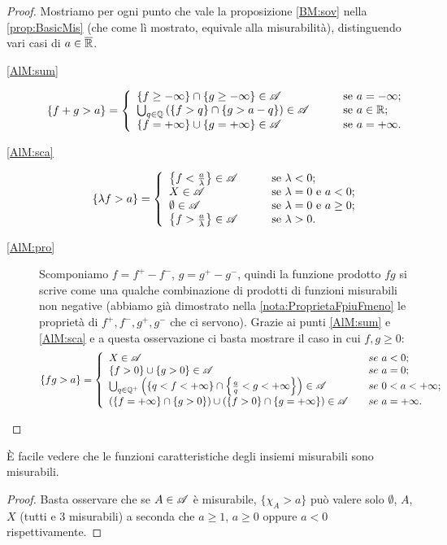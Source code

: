 \begin{proof}
	Mostriamo per ogni punto che vale la proposizione \ref{BM:sov} nella \cref{prop:BasicMis} (che come lì mostrato, equivale alla misurabilità),
	distinguendo vari casi di $a\in \overline{\mathbb R}$.
	\begin{description}
	\item[\ref{AlM:sum}]
	\[
		\{f+g>a\}=\left\{\begin{array}{ll}
			\{f\ge -\infty\}\cap\{g\ge -\infty\}\in \A &\qquad \text{se}\ a=-\infty;\\
			\bigcup_{q\in \Q}\left(\{f>q\}\cap\{g>a-q\}\right)\in \A &\qquad \text{se}\ a\in \R;\\
			\{f=+\infty\}\cup\{g=+\infty\}\in \A &\qquad \text{se}\ a=+\infty.
		\end{array}\right.
	\]
	\item[\ref{AlM:sca}]
	\[
		\{\lambda f>a\}=\left\{\begin{array}{ll}
			\left\{f<\frac{a}{\lambda}\right\}\in \A &\qquad \text{se}\ \lambda<0;\\
			X \in \A &\qquad \text{se}\ \lambda=0\ \text{e}\ a< 0;\\
			\emptyset \in \A &\qquad \text{se}\ \lambda=0\ \text{e}\ a\geq 0;\\
			\left\{f>\frac{a}{\lambda}\right\}\in \A &\qquad \text{se}\ \lambda>0.
		\end{array}\right.
	\]
	\item[\ref{AlM:pro}] Scomponiamo $f=f^+ - f^-$, $g=g^+- g^-$, quindi la funzione prodotto $fg$ si scrive come una qualche combinazione di prodotti di funzioni misurabili non negative (abbiamo già dimostrato nella \cref{nota:ProprietaFpiuFmeno} le proprietà di $f^+,f^-,g^+,g^-$ che ci servono). Grazie ai punti \ref{AlM:sum} e \ref{AlM:sca} e a questa osservazione ci basta mostrare il caso in cui $f,g\geq0$:
	\[
		\{fg>a\}=\left\{\begin{array}{ll}
			X\in \mathscr A &\quad se\ a<0;\\
			\{f>0\}\cup\{g>0\}\in \mathscr A &\quad se\ a=0;\\
			\bigcup_{q\in \mathbb Q^+}\left(\{q<f<+\infty\}\cap\left\{\frac{a}{q}<g<+\infty \right\} \right)\in \mathscr A &\quad se\ 0<a<+\infty;\\
			(\{f=+\infty\}\cap\{g>0\})\cup (\{f>0\}\cap\{g=+\infty\})\in \mathscr A &\quad se\ a=+\infty.
		\end{array}\right.
	\]
	\end{description}
\end{proof}

\begin{remark}\label{nota:CarMis}
	È facile vedere che le funzioni caratteristiche degli insiemi misurabili sono misurabili.
\end{remark}
\begin{proof}
	Basta osservare che se $A\in \mathscr A$ è misurabile, $\{ \chi_A > a\}$ può valere solo $\emptyset$, $A$, $X$ (tutti e 3 misurabili) a seconda che
	$a\geq 1$, $a\geq 0$ oppure $a < 0$ rispettivamente.
\end{proof}

